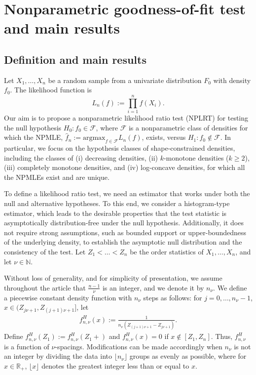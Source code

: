 \documentclass[12pt,letterpaper, twoside, openany]{article}
\theoremstyle{plain}
\begin{document}
\section{Nonparametric goodness-of-fit test and main results}\label{sect:main_result}

\subsection{Definition and main results}\label{sect:prelim}
Let $X_1,\ldots,X_n$ be a random sample from a univariate distribution $F_0$ with density $f_0$. The likelihood function is 
\begin{equation*}
	L_n(f) := \prod^n_{i=1} f(X_i).
\end{equation*}
Our aim is to propose a nonparametric likelihood ratio test (NPLRT) for testing the null hypothesis $H_0: f_0 \in \mathcal{F}$, where $\mathcal{F}$ is a nonparametric class of densities for which the NPMLE, $\hat{f}_n := \text{argmax}_{f \in \mathcal{F}} L_n(f)$, exists, versus $H_1: f_0 \notin \mathcal{F}$. In particular, we focus on the hypothesis classes of shape-constrained densities, including the classes of (i) decreasing densities, (ii) $k$-monotone densities ($k \geq 2$), (iii) completely monotone densities, and (iv) log-concave densities, for which all the NPMLEs exist and are unique.  

To define a likelihood ratio test, we need an estimator that works under both the null and alternative hypotheses. To this end, we consider a histogram-type estimator, which leads to the desirable properties that the test statistic is asymptotically distribution-free under the null hypothesis. Additionally, it does not require strong assumptions, such as bounded support or upper-boundedness of the underlying density, to establish the asymptotic null distribution and the consistency of the test. Let $Z_1 <\ldots < Z_n$ be the order statistics of $X_1,\ldots,X_n$, and let $\nu \in \mathbb{N}$. 

Without loss of generality, and for simplicity of presentation, we assume throughout the article that $\frac{n-1}{\nu}$ is an integer, and we denote {it} by $n_{\nu}$. We define a piecewise constant density function with $n_{\nu}$ steps as follows:
for $j=0,\ldots, n_{\nu} - 1$, $x \in ( Z_{j\nu+1}, Z_{(j+1)\nu+1}]$, let
\begin{align*}
	f^H_{n,\nu}(x) := \frac{1}{n_{\nu}(Z_{(j+1)\nu+1} - Z_{j\nu+1})}.
\end{align*}
Define $f^H_{n,\nu}(Z_1) := f^H_{n,\nu}(Z_1+)$ and $f^H_{n,\nu}(x) = 0$ if $x \notin [Z_1, Z_n]$. Thus, $f^H_{n,\nu}$ is a function of $\nu$-spacings.  Modifications can be made accordingly when $n_{\nu}$ is not an integer by dividing the data into $\lfloor n_{\nu} \rfloor$ groups as evenly as possible, where for $x \in \mathbb{R}_+$, $\lfloor x \rfloor$ denotes the greatest integer less than or equal to $x$.
\end{document}
